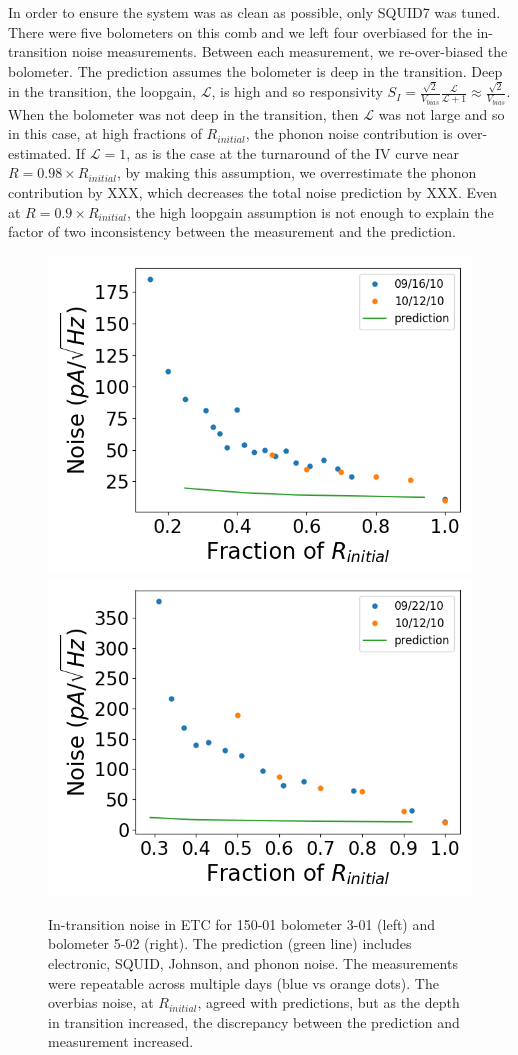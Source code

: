In order to ensure the system was as clean as possible, only \ac{SQUID}7 was tuned. 
There were five bolometers on this comb and we left four overbiased for the in-transition noise measurements. 
Between each measurement, we re-over-biased the bolometer. 
The prediction assumes the bolometer is deep in the transition. 
Deep in the transition, the loopgain, $\mathscr{L}$, is high and so responsivity $S_{I} = \frac{\sqrt{2}}{V_{bias}} \frac{\mathscr{L}}{\mathscr{L}+1} \approx \frac{\sqrt{2}}{V_{bias}} $. 
When the bolometer was not deep in the transition, then $\mathscr{L}$ was not large and so in this case, at high fractions of $R_{initial}$, the phonon noise contribution is over-estimated. 
If $\mathscr{L} = 1$, as is the case at the turnaround of the IV curve near $R = 0.98 \times R_{initial}$, by making this assumption, we overrestimate the phonon contribution by XXX, which decreases the total noise prediction by XXX. 
Even at $R = 0.9 \times R_{initial}$, the high loopgain assumption is not enough to explain the factor of two inconsistency between the measurement and the prediction. 
 

\begin{figure}[ht!]
\begin{center}
\includegraphics[width=0.48\columnwidth]{figures/b54w2c0_it_noise.png}
\includegraphics[width=0.48\columnwidth]{figures/b54w2c3_it_noise.png}
\caption{In-transition noise in \ac{ETC} for 150-01 bolometer 3-01 (left) and bolometer 5-02 (right). The prediction (green line) includes electronic, \ac{SQUID}, Johnson, and phonon noise. The measurements were repeatable across multiple days (blue vs orange dots). The overbias noise, at $R_{initial}$, agreed with predictions, but as the depth in transition increased, the discrepancy between the prediction and measurement increased. 
\label{fig:etc_it_noise} }
\end{center}
\end{figure}

